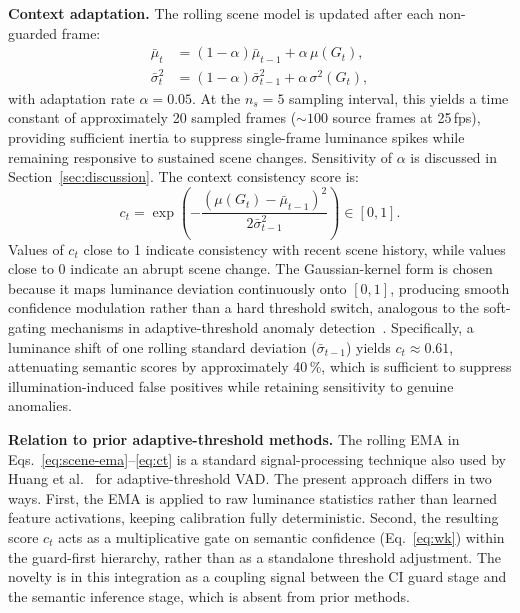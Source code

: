 \documentclass[sensors,article,submit,pdftex,moreauthors]{Definitions/mdpi}
\begin{document}
\textbf{Context adaptation.} The rolling scene model is updated after each non-guarded frame:
\begin{equation}
\label{eq:scene-ema}
\begin{aligned}
\bar{\mu}_t &= (1-\alpha)\bar{\mu}_{t-1} + \alpha\,\mu(G_t), \\
\bar{\sigma}_t^2 &= (1-\alpha)\bar{\sigma}_{t-1}^2 + \alpha\,\sigma^2(G_t),
\end{aligned}
\end{equation}
with adaptation rate $\alpha = 0.05$. At the $n_s{=}5$ sampling interval, this yields a time constant of approximately 20 sampled frames (${\sim}100$ source frames at 25\,fps), providing sufficient inertia to suppress single-frame luminance spikes while remaining responsive to sustained scene changes. Sensitivity of $\alpha$ is discussed in Section~\ref{sec:discussion}. The context consistency score is:
\begin{equation}
\label{eq:ct}
c_t = \exp\!\left(-\frac{(\mu(G_t)-\bar{\mu}_{t-1})^2}{2\bar{\sigma}_{t-1}^2}\right) \in [0,1].
\end{equation}
Values of $c_t$ close to 1 indicate consistency with recent scene history, while values close to 0 indicate an abrupt scene change. The Gaussian-kernel form is chosen because it maps luminance deviation continuously onto $[0,1]$, producing smooth confidence modulation rather than a hard threshold switch, analogous to the soft-gating mechanisms in adaptive-threshold anomaly detection~\cite{huang2024selfsupervised}. Specifically, a luminance shift of one rolling standard deviation ($\bar{\sigma}_{t-1}$) yields $c_t \approx 0.61$, attenuating semantic scores by approximately 40\,\%, which is sufficient to suppress illumination-induced false positives while retaining sensitivity to genuine anomalies.
 
\textbf{Relation to prior adaptive-threshold methods.}
The rolling EMA in Eqs.~\eqref{eq:scene-ema}--\eqref{eq:ct} is a standard signal-processing technique also used by Huang et al.~\cite{huang2024selfsupervised} for adaptive-threshold VAD. The present approach differs in two ways. First, the EMA is applied to raw luminance statistics rather than learned feature activations, keeping calibration fully deterministic. Second, the resulting score $c_t$ acts as a multiplicative gate on semantic confidence (Eq.~\eqref{eq:wk}) within the guard-first hierarchy, rather than as a standalone threshold adjustment. The novelty is in this integration as a coupling signal between the CI guard stage and the semantic inference stage, which is absent from prior methods.
 
\end{document}
